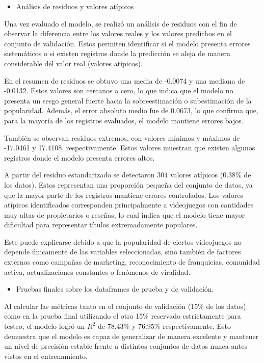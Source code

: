 \documentclass[12pt]{report}
\begin{document}
\begin{itemize}
    \item Análisis de residuos y valores atípicos
\end{itemize}
Una vez evaluado el modelo, se realizó un análisis de residuos con el fin de observar la diferencia entre los valores reales y los valores predichos en el conjunto de validación. Estos permiten identificar si el modelo presenta errores sistemáticos o si existen registros donde la predicción se aleja de manera considerable del valor real (valores atípicos).

En el resumen de residuos se obtuvo una media de -0.0074 y una mediana de -0.0132. Estos valores son cercanos a cero, lo que indica que el modelo no presenta un sesgo general fuerte hacia la sobreestimación o subestimación de la popularidad. Además, el error absoluto medio fue de 0.0673, lo que confirma que, para la mayoría de los registros evaluados, el modelo mantiene errores bajos.

También se observan residuos extremos, con valores mínimos y máximos de -17.0461 y 17.4108, respectivamente. Estos valores muestran que existen algunos registros donde el modelo presenta errores altos.

A partir del residuo estandarizado se detectaron 304 valores atípicos (0.38\% de los datos). Estos representan una proporción pequeña del conjunto de datos, ya que la mayor parte de los registros mantiene errores controlados. Los valores atípicos identificados corresponden principalmente a videojuegos con cantidades muy altas de propietarios o reseñas, lo cual indica que el modelo tiene mayor dificultad para representar títulos extremadamente populares.

Este puede explicarse debido a que la popularidad de ciertos videojuegos no depende únicamente de las variables seleccionadas, sino también de factores externos como campañas de marketing, reconocimiento de franquicias, comunidad activa, actualizaciones constantes o fenómenos de viralidad.

\begin{itemize}
    \item Pruebas finales sobre los dataframes de prueba y de validación.
\end{itemize}
Al calcular las métricas tanto en el conjunto de validación (15\% de los datos) como en la prueba final utilizando el otro 15\% reservado estrictamente para testeo, el modelo logró un $R^2$ de 78.43\% y 76.95\% respectivamente. Esto demuestra que el modelo es capaz de generalizar de manera excelente y mantener un nivel de precisión estable frente a distintos conjuntos de datos nunca antes vistos en el entrenamiento.
\end{document}
